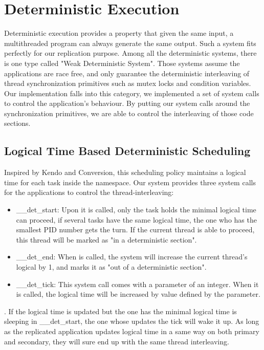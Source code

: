 \chapter{Deterministic Execution}
Deterministic execution provides a property that given the same input, a multithreaded program can always generate the same output. Such a system fits perfectly for our replication purpose. Among all the deterministic systems, there is one type called "Weak Deterministic System". Those systems assume the applications are race free, and only guarantee the deterministic interleaving of thread synchronization primitives such as mutex locks and condition variables. Our implementation falls into this category, we implemented a set of system calls to control the application's behaviour. By putting our system calls around the synchronization primitives, we are able to control the interleaving of those code sections.

\section{Logical Time Based Deterministic Scheduling}
Inspired by Kendo\cite{olszewski2009kendo} and Conversion\cite{merrifieldincreasing}, this scheduling policy maintains a logical time for each task inside the namespace. Our system provides three system calls for the applications to control the thread-interleaving:
\begin{itemize}
   \item \_\_det\_start: Upon it is called, only the task holds the minimal logical time can proceed, if several tasks have the same logical time, the one who has the smallest PID number gets the turn. If the current thread is able to proceed, this thread will be marked as "in a deterministic section".
   \item \_\_det\_end: When is called, the system will increase the current thread's logical by 1, and marks it as "out of a deterministic section".
   \item \_\_det\_tick: This system call comes with a parameter of an integer. When it is called, the logical time will be increased by value defined by the parameter.
\end{itemize}. 
If the logical time is updated but the one has the minimal logical time is sleeping in \_\_det\_start, the one whose updates the tick will wake it up. As long as the replicated application updates logical time in a same way on both primary and secondary, they will sure end up with the same thread interleaving.


